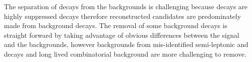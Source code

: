 The separation of \bmumu decays from the backgrounds is challenging because \bmumu decays are highly suppressed decays therefore reconstructed candidates are predominately made from background decays.
The removal of some background decays is straight forward by taking advantage of obvious differences between the signal and the backgrounds, however backgrounds from mis-identified semi-leptonic and \bhh decays and long lived combinatorial background are more challenging to remove. %



